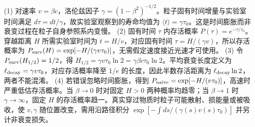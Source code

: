(1) 对速率 \(v=\beta c\)，洛伦兹因子 \(\gamma=(1-\beta^2)^{-1/2}\)。粒子固有时间增量与实验室时间满足 \(d\tau=dt/\gamma\)，故实验室观察到的寿命均值为 \(\langle t\rangle=\gamma\tau_0\)。这是时间膨胀而非衰变过程在粒子自身参照系内变慢。
(2) 固有时间 \(\tau\) 内存活概率 \(P(\tau)=e^{-\tau/\tau_0}\)。穿越距离 \(H\) 所需实验室时间为 \(t=H/v\)，对应固有时间 \(\tau=H/(\gamma v)\)，所以存活概率为 \(P_{\rm surv}(H)=\exp[-H/(\gamma v\tau_0)]\)，无需假定速度接近光速才可使用。
(3) 令 \(P_{\rm surv}(H_{1/2})=1/2\)，得 \(H_{1/2}=\gamma v\tau_0\ln2=\gamma\beta c\tau_0\ln2\)。平均衰变长度定义为 \(\ell_{\rm decay}=\gamma v\tau_0\)，对应存活概率降至 \(1/e\) 的长度，因此半数存活距离为 \(\ell_{\rm decay}\ln2\)，两者不能混淆。
(4) 若错误忽略时间膨胀，得到 \(P_{\rm naive}=\exp[-H/(v\tau_0)]\)，高速时严重低估存活概率。当 \(\beta\to0\) 时对固定 \(H>0\) 两种概率均趋零；当 \(\beta\to1\) 时 \(\gamma\to\infty\)，固定 \(H\) 的存活概率趋一。真实穿过物质时粒子可能散射、损能量或被吸收，使 \(v,\gamma\) 随位置改变，需用沿路径积分 \(\exp[-\int ds/(\gamma(s)v(s)\tau_0)]\) 并另计非衰变损失。
